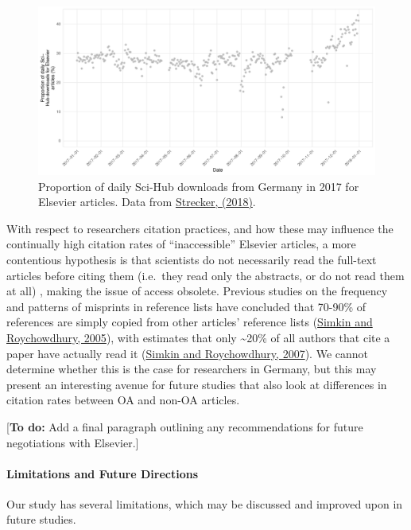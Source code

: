 \documentclass[
]{article}
\begin{document}
\begin{figure}

{\centering \includegraphics[width=0.6\linewidth]{analysis_files/figure-latex/scihub-germany-1} 

}

\caption{Proportion of daily Sci-Hub downloads from Germany in 2017 for Elsevier articles. Data from \href{http://doi.org/10.5281/zenodo.1286284}{Strecker, (2018)}.}\label{fig:scihub-germany}
\end{figure}

With respect to researchers citation practices, and how these may influence the continually high citation rates of ``inaccessible'' Elsevier articles, a more contentious hypothesis is that scientists do not necessarily read the full-text articles before citing them (i.e.~they read only the abstracts, or do not read them at all) , making the issue of access obsolete. Previous studies on the frequency and patterns of misprints in reference lists have concluded that 70-90\% of references are simply copied from other articles' reference lists (\href{https://doi.org/10.1007/s11192-005-0028-2}{Simkin and Roychowdhury, 2005}), with estimates that only \textasciitilde20\% of all authors that cite a paper have actually read it (\href{https://doi.org/10.1002/asi.20653}{Simkin and Roychowdhury, 2007}). We cannot determine whether this is the case for researchers in Germany, but this may present an interesting avenue for future studies that also look at differences in citation rates between OA and non-OA articles.

{[}\textbf{To do:} Add a final paragraph outlining any recommendations for future negotiations with Elsevier.{]}

\hypertarget{limitations-and-future-directions}{%
\paragraph{Limitations and Future Directions}\label{limitations-and-future-directions}}

Our study has several limitations, which may be discussed and improved upon in future studies.
\end{document}

